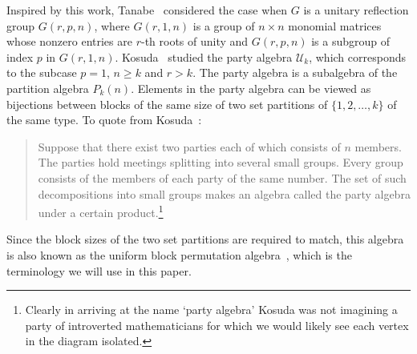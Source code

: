 \documentclass[ALCO,Unicode]{cedram}
\begin{document}
Inspired by this work, Tanabe~\cite{Tanabe.1997} considered the case when $G$ is a unitary reflection group $G(r,p,n)$, where $G(r,1,n)$ is a group
of $n \times n$ monomial matrices whose nonzero entries are $r$-th roots of unity and $G(r,p,n)$ is a subgroup of index $p$ in $G(r,1,n)$.
Kosuda~\cite{Kosuda.2000, Kosuda.2006} studied the party algebra $\mathcal{U}_k$, which corresponds to the subcase $p=1$, $n \geqslant k$
and $r>k$. The party algebra is a subalgebra of the partition algebra $P_k(n)$. Elements in the party algebra can be viewed as bijections between blocks
of the same size of two set partitions of $\{1,2,\ldots,k\}$ of the same type. To quote from Kosuda~\cite{Kosuda.2000}:
\begin{quote}
Suppose that there exist two parties each of which consists of $n$ members. The parties hold meetings splitting into several small groups.
Every group consists of the members of each party of the same number. The set of such decompositions into small groups makes an algebra
called the party algebra under a certain product.\footnote{Clearly in arriving at the name
`party algebra' Kosuda was not imagining a party of introverted mathematicians for
which we would likely see each vertex in the diagram isolated.}
\end{quote}
Since the block sizes of the two set  partitions are required to match, this algebra is also known as the uniform block permutation
algebra~\cite{FitzGerald.2003}, which is the terminology we will use in this paper.
\end{document}
